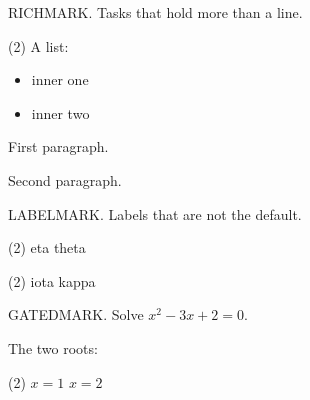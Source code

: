 \documentclass{didactic}
\begin{document}
\begin{exercise}
	RICHMARK. Tasks that hold more than a line.
	\begin{tasks}(2)
		\task A list:
		\begin{itemize}
			\item inner one
			\item inner two
		\end{itemize}
		\task First paragraph.

		Second paragraph.
	\end{tasks}
\end{exercise}

\begin{exercise}
	LABELMARK. Labels that are not the default.
	\begin{tasks}[label = $\alph*_0$, label-width = 2em](2)
		\task eta
		\task theta
	\end{tasks}
	\begin{tasks}[label = \textbullet](2)
		\task iota
		\task kappa
	\end{tasks}
\end{exercise}

\begin{exercise}
	GATEDMARK. Solve $x^2 - 3x + 2 = 0$.
\end{exercise}

\begin{solution}[1in]
	The two roots:
	\begin{tasks}(2)
		\task $x = 1$
		\task $x = 2$
	\end{tasks}
\end{solution}
\end{document}
